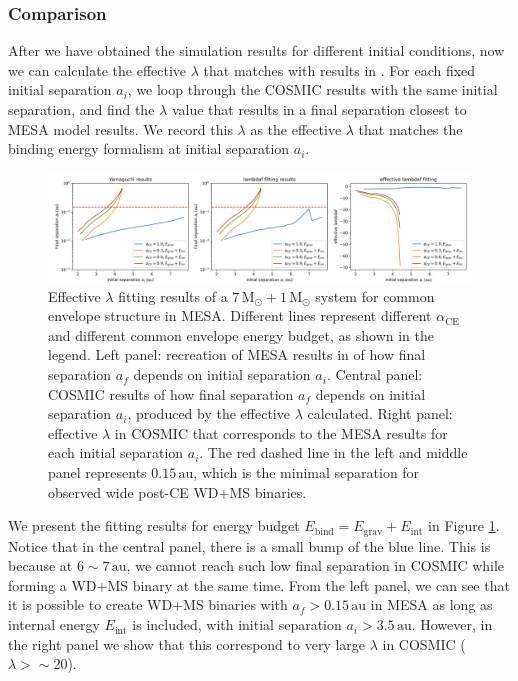 \documentclass[12pt]{article}
\newcommand{\Msun}{\,\mathrm{M_{\odot}}}
\newcommand{\alphace}{\alpha_{\mathrm{CE}}}
\newcommand{\Ebind}{E_{\mathrm{bind}}}
\newcommand{\Egrav}{E_{\mathrm{grav}}}
\newcommand{\Eint}{E_{\mathrm{int}}}
\newcommand{\au}{\, \mathrm{au}}
\begin{document}
\subsubsection{Comparison}
After we have obtained the simulation results for different initial conditions, now we can calculate the effective $\lambda$ that matches with results in \cite{yamaguchi_hi}. For each fixed initial separation $a_i$, we loop through the COSMIC results with the same initial separation, and find the $\lambda$ value that results in a final separation closest to MESA model results. We record this $\lambda$ as the effective $\lambda$ that matches the binding energy formalism at initial separation $a_i$.

\begin{figure}
  \centering
  \includegraphics[width=\linewidth]{fig/7+1fit.png}
  \caption{Effective $\lambda$ fitting results of a $7\Msun + 1\Msun$ system for common envelope structure in MESA. Different lines represent different $\alphace$ and different common envelope energy budget, as shown in the legend. Left panel: recreation of MESA results in \cite{yamaguchi_hi} of how final separation $a_f$ depends on initial separation $a_i$. Central panel: COSMIC results of how final separation $a_f$ depends on initial separation $a_i$, produced by the effective $\lambda$ calculated. Right panel: effective $\lambda$ in COSMIC that corresponds to the MESA results for each initial separation $a_i$. The red dashed line in the left and middle panel represents $0.15 \au$, which is the minimal separation for observed wide post-CE WD+MS binaries.}
  \label{fit_hi}
\end{figure}

We present the fitting results for energy budget $\Ebind = \Egrav + \Eint$ in Figure \ref{fit_hi}. Notice that in the central panel, there is a small bump of the blue line. This is because at $6 \sim 7 \au$, we cannot reach such low final separation in COSMIC while forming a WD+MS binary at the same time. From the left panel, we can see that it is possible to create WD+MS binaries with $a_f > 0.15 \au$ in MESA as long as internal energy $\Eint$ is included, with initial separation $a_i > 3.5 \au$. However, in the right panel we show that this correspond to very large $\lambda$ in COSMIC ($\lambda > \sim 20$).
\end{document}
